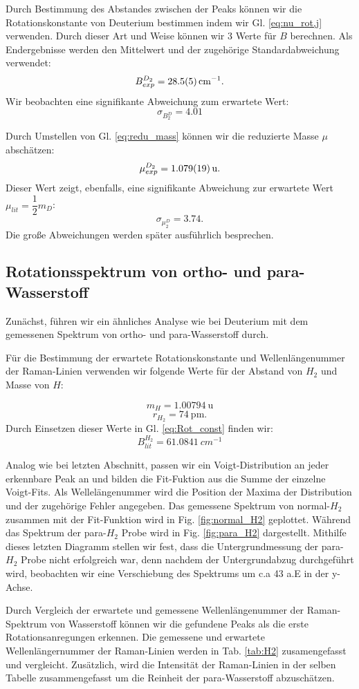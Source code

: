 \documentclass[11 pt]{article}
\begin{document}
Durch Bestimmung des Abstandes zwischen der Peaks können wir die Rotationskonstante von Deuterium bestimmen indem wir Gl. \ref{eq:nu_rot,j} verwenden. Durch dieser Art und Weise können wir 3 Werte für $B$ berechnen. Als Endergebnisse werden den Mittelwert und der zugehörige  Standardabweichung verwendet: 
$$B_{exp}^{D_2} = \SI{28.5\pm 0.5}{cm^{-1}}.$$
Wir beobachten eine signifikante Abweichung zum erwartete Wert:
$$\sigma_{B^D_2} = 4.01$$ 
 
Durch Umstellen von Gl. \ref{eq:redu_mass} können wir die reduzierte Masse $\mu$ abschätzen:
$$\mu_{exp}^{D_2} = \SI{1.079\pm 0.019}{\atomicmassunit}.$$
Dieser Wert zeigt, ebenfalls, eine signifikante Abweichung zur erwartete Wert $\mu_{lit} = \dfrac{1}{2}m_D$:
$$\sigma_{\mu^D_2} = 3.74.$$
Die große Abweichungen werden später ausführlich besprechen. 


\subsection{Rotationsspektrum von ortho- und para-Wasserstoff}
Zunächst, führen wir ein ähnliches Analyse wie bei Deuterium mit dem gemessenen Spektrum von ortho- und para-Wasserstoff durch.

Für die Bestimmung der erwartete Rotationskonstante und Wellenlängenummer der Raman-Linien verwenden wir folgende Werte für der Abstand von $H_2$ und Masse von $H$:

$$m_{H} =\SI{1.00794}{\atomicmassunit}$$
$$r_{H_2} = \SI{74}{\pm}.$$
Durch Einsetzen dieser Werte in Gl. \ref{eq:Rot_const} finden wir:
$$B_{lit}^{H_2} = \SI{61.0841}{cm^{-1}} $$

Analog wie bei letzten Abschnitt, passen wir ein Voigt-Distribution an jeder erkennbare Peak an und bilden die Fit-Fuktion aus die Summe der einzelne Voigt-Fits. Als Wellelängenummer wird die Position der Maxima der Distribution und der zugehörige Fehler angegeben. Das gemessene Spektrum von normal-$H_2$ zusammen mit der Fit-Funktion wird in Fig. \ref{fig:normal_H2} geplottet. Während das Spektrum der para-$H_2$ Probe wird in Fig. \ref{fig:para_H2} dargestellt. Mithilfe dieses letzten Diagramm stellen wir fest, dass die Untergrundmessung der para-$H_2$ Probe nicht erfolgreich war, denn nachdem der Untergrundabzug durchgeführt wird, beobachten wir eine Verschiebung des Spektrums um c.a 43 a.E in der y-Achse. 

Durch Vergleich der erwartete und gemessene Wellenlängenummer der Raman-Spektrum von Wasserstoff können wir die gefundene Peaks als die erste Rotationsanregungen erkennen. Die gemessene und erwartete Wellenlängernummer der Raman-Linien werden in Tab. \ref{tab:H2} zusamengefasst und vergleicht. Zusätzlich, wird die Intensität der Raman-Linien in der selben Tabelle zusammengefasst um die Reinheit der para-Wasserstoff abzuschätzen. 
\end{document}
